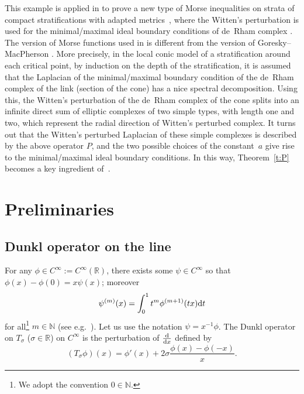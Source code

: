 \documentclass[11pt]{article}
\newcommand{\R}{\mathbb{R}}
\newcommand{\N}{\mathbb{N}}
\newcommand{\Cinf}{C^\infty}
\begin{document}
This example is applied in \cite{AlvCalaza:Witten} to prove a new type of Morse inequalities on strata of compact stratif\/ications \cite{Mather1970,Thom1969,Verona1984} with adapted metrics~\cite{BrasseletHectorSaralegi1992, Nagase1983,Nagase1986}, where the Witten's perturbation \cite{Witten1982} is used for the minimal/maximal ideal boundary conditions of de~Rham complex \cite{BruningLesch1992, Cheeger1980,Cheeger1983}. The version of Morse functions used in \cite{AlvCalaza:Witten} is dif\/ferent from the version of Goresky--MacPherson \cite{GoreskyMacPherson1983:Morse}. More precisely, in the local conic model of a stratif\/ication around each critical point, by induction on the depth of the stratif\/ication, it is assumed that the Laplacian of the minimal/maximal boundary condition of the de~Rham complex of the link (section of the cone) has a nice spectral decomposition. Using this, the Witten's perturbation of the de~Rham complex of the cone splits into an inf\/inite direct sum of elliptic complexes of two simple types, with length one and two, which represent the radial direction of Witten's perturbed complex. It turns out that the Witten's perturbed Laplacian of these simple complexes is described by the above operator $P$, and the two possible choices of the constant~$a$ give rise to the minimal/maximal ideal boundary conditions. In this way, Theorem~\ref{t:P} becomes a key ingredient of~\cite{AlvCalaza:Witten}.

\section{Preliminaries}\label{s:preliminaries}

\subsection{Dunkl operator on the line}\label{ss:D sigma}

For any $\phi\in\Cinf:=\Cinf(\R)$, there exists some $\psi\in\Cinf$ so that $\phi(x)-\phi(0)=x\psi(x)$; moreover
  \begin{gather}\label{psi (m)(x)}
    \psi^{(m)}(x)=\int_0^1t^m\phi^{(m+1)}(tx){\rm d}t
  \end{gather}
for all\footnote{We adopt the convention $0\in\N$.} $m\in\N$ (see e.g.~\cite[Theorem~1.1.9]{Hormander1990-I}). Let us use the notation $\psi=x^{-1}\phi$. The Dunkl operator on $T_\sigma$ ($\sigma\in\R$) on $\Cinf$ is the perturbation of $\frac{{\rm d}}{{\rm d}x}$ def\/ined by
  \[
    (T_\sigma\phi)(x)=\phi'(x)+2\sigma \frac{\phi(x)-\phi(-x)}{x} .
  \]
\end{document}
